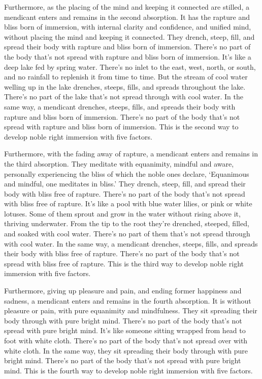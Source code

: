 \documentclass[12pt,openany]{book}%
\begin{document}
Furthermore, as the placing of the mind and keeping it connected are stilled, a mendicant enters and remains in the second absorption. It has the rapture and bliss born of immersion, with internal clarity and confidence, and unified mind, without placing the mind and keeping it connected. They drench, steep, fill, and spread their body with rapture and bliss born of immersion. There’s no part of the body that’s not spread with rapture and bliss born of immersion. It’s like a deep lake fed by spring water. There’s no inlet to the east, west, north, or south, and no rainfall to replenish it from time to time. But the stream of cool water welling up in the lake drenches, steeps, fills, and spreads throughout the lake. There’s no part of the lake that’s not spread through with cool water. In the same way, a mendicant drenches, steeps, fills, and spreads their body with rapture and bliss born of immersion. There’s no part of the body that’s not spread with rapture and bliss born of immersion. This is the second way to develop noble right immersion with five factors. 

Furthermore, with the fading away of rapture, a mendicant enters and remains in the third absorption. They meditate with equanimity, mindful and aware, personally experiencing the bliss of which the noble ones declare, ‘Equanimous and mindful, one meditates in bliss.’ They drench, steep, fill, and spread their body with bliss free of rapture. There’s no part of the body that’s not spread with bliss free of rapture. It’s like a pool with blue water lilies, or pink or white lotuses. Some of them sprout and grow in the water without rising above it, thriving underwater. From the tip to the root they’re drenched, steeped, filled, and soaked with cool water. There’s no part of them that’s not spread through with cool water. In the same way, a mendicant drenches, steeps, fills, and spreads their body with bliss free of rapture. There’s no part of the body that’s not spread with bliss free of rapture. This is the third way to develop noble right immersion with five factors. 

Furthermore, giving up pleasure and pain, and ending former happiness and sadness, a mendicant enters and remains in the fourth absorption. It is without pleasure or pain, with pure equanimity and mindfulness. They sit spreading their body through with pure bright mind. There’s no part of the body that’s not spread with pure bright mind. It’s like someone sitting wrapped from head to foot with white cloth. There’s no part of the body that’s not spread over with white cloth. In the same way, they sit spreading their body through with pure bright mind. There’s no part of the body that’s not spread with pure bright mind. This is the fourth way to develop noble right immersion with five factors. 
\end{document}

